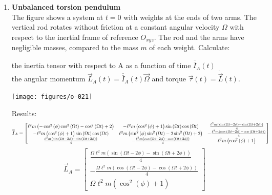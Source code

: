 \documentclass[11pt, a4paper, twoside]{article}
\begin{document}
\begin{enumerate}
	\item 
	\begin{minipage}[t][6cm]{0.65\textwidth}
		\textbf{Unbalanced torsion pendulum}\\
		The figure shows a system at \(t = 0 \) with weights at the ends of two arms.
		The vertical rod rotates without friction at a constant angular velocity $\Omega$ with respect to the inertial frame of reference $O_{xyz}$. The rod and the arms have negligible masses, compared to the mass \(m\) of each weight.
		Calculate: 
		\begin{tasks} 
			\task the inertia tensor with respect to A as a function of time \(\overline{\overline{I}}_A(t)\)\\
			\task the angular momentum $\vec{L}_A (t) = \overline{\overline{I}}_A (t) \vec{\Omega}$ and torque $\vec{\tau} (t) = \dot{\vec{L}} (t)$.
		\end{tasks}
	\end{minipage}
	\begin{minipage}[c][0cm][t]{0.3\textwidth}
		\texttt{[image: figures/o-021]}
	\end{minipage}
	Results:\\
			\[
				\scalebox{0.9}{$
				\overline{\overline{I}}_A = \left[\begin{matrix}\ell^{2} m \left(- \cos^{2}{\left(\phi \right)} \cos^{2}{\left(\Omega t \right)} - \cos^{2}{\left(\Omega t \right)} + 2\right) & - \ell^{2} m \left(\cos^{2}{\left(\phi \right)} + 1\right) \sin{\left(\Omega t \right)} \cos{\left(\Omega t \right)} & \frac{\ell^{2} m \left(\sin{\left(\Omega t - 2 \phi \right)} - \sin{\left(\Omega t + 2 \phi \right)}\right)}{4}\\- \ell^{2} m \left(\cos^{2}{\left(\phi \right)} + 1\right) \sin{\left(\Omega t \right)} \cos{\left(\Omega t \right)} & \ell^{2} m \left(\sin^{2}{\left(\phi \right)} \sin^{2}{\left(\Omega t \right)} - 2 \sin^{2}{\left(\Omega t \right)} + 2\right) & - \frac{\ell^{2} m \left(\cos{\left(\Omega t - 2 \phi \right)} - \cos{\left(\Omega t + 2 \phi \right)}\right)}{4}\\\frac{\ell^{2} m \left(\sin{\left(\Omega t - 2 \phi \right)} - \sin{\left(\Omega t + 2 \phi \right)}\right)}{4} & - \frac{\ell^{2} m \left(\cos{\left(\Omega t - 2 \phi \right)} - \cos{\left(\Omega t + 2 \phi \right)}\right)}{4} & \ell^{2} m \left(\cos^{2}{\left(\phi \right)} + 1\right)\end{matrix}\right]
				$}
				\] 
			\[
				\vec{L}_A = \left[\begin{matrix}\frac{\Omega \ell^{2} m \left(\sin{\left(\Omega t - 2 \phi \right)} - \sin{\left(\Omega t + 2 \phi \right)}\right)}{4}\\- \frac{\Omega \ell^{2} m \left(\cos{\left(\Omega t - 2 \phi \right)} - \cos{\left(\Omega t + 2 \phi \right)}\right)}{4}\\\Omega \ell^{2} m \left(\cos^{2}{\left(\phi \right)} + 1\right)\end{matrix}\right]
\]
\end{enumerate}
\end{document}
